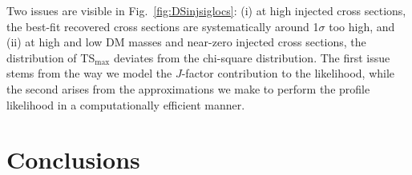 Two issues are visible in Fig.~\ref{fig:DSinjsiglocs}: (i) at high injected cross sections, the best-fit recovered cross sections are systematically around 1$\sigma$ too high, and (ii) at high and low DM masses and near-zero injected cross sections, the distribution of TS$_\text{max}$ deviates from the chi-square distribution.  The first issue stems from the way we model the $J$-factor contribution to the likelihood, while the second arises from the approximations we make to perform the profile likelihood in a computationally efficient manner.  %

\section{Conclusions}
\label{sec:conclusions}

